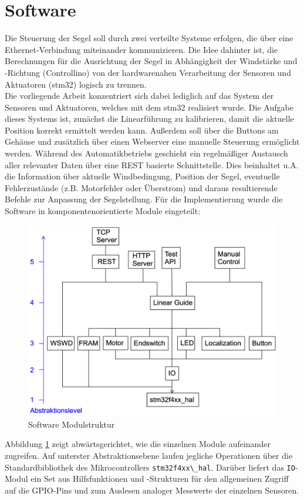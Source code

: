 \section{Software}
Die Steuerung der Segel soll durch zwei verteilte Systeme erfolgen, die über eine Ethernet-Verbindung miteinander kommunizieren. Die Idee dahinter ist, die Berechnungen für die Ausrichtung der Segel in Abhängigkeit der Windstärke und -Richtung (Controllino) von der hardwarenahen Verarbeitung der Sensoren und Aktuatoren (stm32) logisch zu trennen. \\

\noindent
Die vorliegende Arbeit konzentriert sich dabei lediglich auf das System der Sensoren und Aktuatoren, welches mit dem stm32 realisiert wurde. Die Aufgabe dieses Systems ist, zunächst die Linearführung zu kalibrieren, damit die aktuelle Position korrekt ermittelt werden kann. Außerdem soll über die Buttons am Gehäuse und zusätzlich über einen Webserver eine manuelle Steuerung ermöglicht werden. Während des Automatikbetriebs geschieht ein regelmäßiger Austausch aller relevanter Daten über eine REST basierte Schnittstelle. Dies beinhaltet u.A. die Information über aktuelle Windbedingung, Position der Segel, eventuelle Fehlerzustände (z.B. Motorfehler oder Überstrom) und daraus resultierende Befehle zur Anpassung der Segelstellung.
Für die Implementierung wurde die Software in komponentenorientierte Module eingeteilt:
\begin{figure}[H]
	\centering
	\includegraphics[width=0.6\linewidth]{images/Software/Modulestructure.png}
	\caption{Software Modulstruktur}
	\label{fig:modulestructure}
\end{figure}
\noindent
Abbildung \ref{fig:modulestructure} zeigt abwärtsgerichtet, wie die einzelnen Module aufeinander zugreifen. Auf unterster Abstraktionsebene laufen jegliche Operationen über die Standardbibliothek des Mikrocontrollers \verb|stm32f4xx\_hal|. Darüber liefert das \verb|IO|-Modul ein Set aus Hilfsfunktionen und -Strukturen für den allgemeinen Zugriff auf die GPIO-Pins und zum Auslesen analoger Messwerte der einzelnen Sensoren.\\

